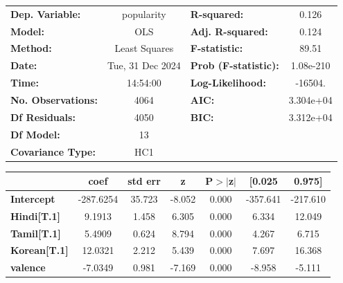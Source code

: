 \begin{center}
\begin{tabular}{lclc}
\toprule
\textbf{Dep. Variable:}                &    popularity    & \textbf{  R-squared:         } &     0.126   \\
\textbf{Model:}                        &       OLS        & \textbf{  Adj. R-squared:    } &     0.124   \\
\textbf{Method:}                       &  Least Squares   & \textbf{  F-statistic:       } &     89.51   \\
\textbf{Date:}                         & Tue, 31 Dec 2024 & \textbf{  Prob (F-statistic):} & 1.08e-210   \\
\textbf{Time:}                         &     14:54:00     & \textbf{  Log-Likelihood:    } &   -16504.   \\
\textbf{No. Observations:}             &        4064      & \textbf{  AIC:               } & 3.304e+04   \\
\textbf{Df Residuals:}                 &        4050      & \textbf{  BIC:               } & 3.312e+04   \\
\textbf{Df Model:}                     &          13      & \textbf{                     } &             \\
\textbf{Covariance Type:}              &       HC1        & \textbf{                     } &             \\
\bottomrule
\end{tabular}
\begin{tabular}{lcccccc}
                                       & \textbf{coef} & \textbf{std err} & \textbf{z} & \textbf{P$> |$z$|$} & \textbf{[0.025} & \textbf{0.975]}  \\
\midrule
\textbf{Intercept}                     &    -287.6254  &       35.723     &    -8.052  &         0.000        &     -357.641    &     -217.610     \\
\textbf{Hindi[T.1]}                    &       9.1913  &        1.458     &     6.305  &         0.000        &        6.334    &       12.049     \\
\textbf{Tamil[T.1]}                    &       5.4909  &        0.624     &     8.794  &         0.000        &        4.267    &        6.715     \\
\textbf{Korean[T.1]}                   &      12.0321  &        2.212     &     5.439  &         0.000        &        7.697    &       16.368     \\
\textbf{valence}                       &      -7.0349  &        0.981     &    -7.169  &         0.000        &       -8.958    &       -5.111     \\

\end{tabular}
\end{center}
